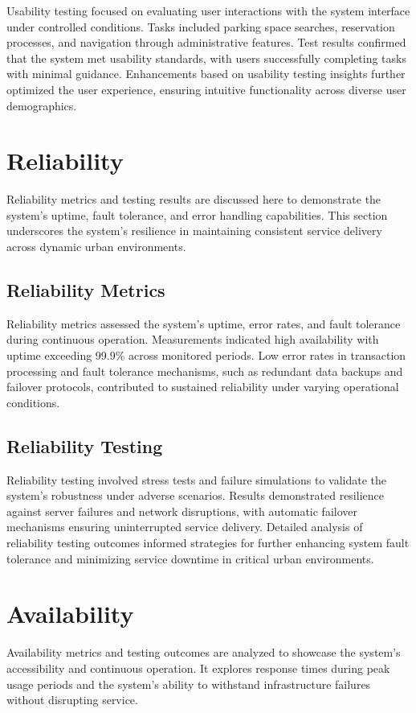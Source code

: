 \documentclass[oneside, 12pt, a4paper, draft]{book}
\begin{document}
Usability testing focused on evaluating user interactions with the system interface under controlled conditions. Tasks included parking space searches, reservation processes, and navigation through administrative features. Test results confirmed that the system met usability standards, with users successfully completing tasks with minimal guidance. Enhancements based on usability testing insights further optimized the user experience, ensuring intuitive functionality across diverse user demographics.
\chapter{Reliability}
\label{sec:org5a9adcf}
Reliability metrics and testing results are discussed here to demonstrate the system's uptime, fault tolerance, and error handling capabilities. This section underscores the system's resilience in maintaining consistent service delivery across dynamic urban environments.
\section{Reliability Metrics}
\label{sec:org0c9585c}

Reliability metrics assessed the system's uptime, error rates, and fault tolerance during continuous operation. Measurements indicated high availability with uptime exceeding 99.9\% across monitored periods. Low error rates in transaction processing and fault tolerance mechanisms, such as redundant data backups and failover protocols, contributed to sustained reliability under varying operational conditions.
\section{Reliability Testing}
\label{sec:org4d226a3}

Reliability testing involved stress tests and failure simulations to validate the system's robustness under adverse scenarios. Results demonstrated resilience against server failures and network disruptions, with automatic failover mechanisms ensuring uninterrupted service delivery. Detailed analysis of reliability testing outcomes informed strategies for further enhancing system fault tolerance and minimizing service downtime in critical urban environments.
\chapter{Availability}
\label{sec:org53162d0}
Availability metrics and testing outcomes are analyzed to showcase the system's accessibility and continuous operation. It explores response times during peak usage periods and the system's ability to withstand infrastructure failures without disrupting service.
\end{document}
